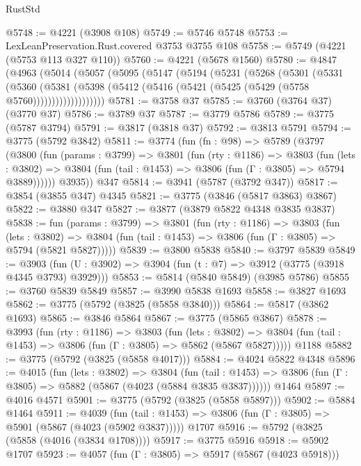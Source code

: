 \begin{lexlean}{RustStd}
\begin{coremodule}
{\begin{coremodule}
{{{{{{{{{{{{{{{{{{{{{{{{{{{{{{{@5748 := @4221 (@3908 @108)
@5749 := @5746 @5748
@5753 := LexLeanPreservation.Rust.covered @3753 @3755 @108
@5758 := @5749 (@4221 (@5753 @113 @327 @110))
@5760 := @4221 (@5678 @1560)
@5780 := @4847
    (@4963
      (@5014
        (@5057
          (@5095
            (@5147
              (@5194
                (@5231
                  (@5268
                    (@5301
                      (@5331
                        (@5360
                          (@5381
                            (@5398
                              (@5412 (@5416 (@5421 (@5425 (@5429 (@5758 @5760)))))))))))))))))))
@5781 := @3758 @37
@5785 := @3760 (@3764 @37) (@3770 @37)
@5786 := @3789 @37
@5787 := @3779 @5786
@5789 := @3775 (@5787 @3794)
@5791 := @3817 (@3818 @37)
@5792 := @3813 @5791
@5794 := @3775 (@5792 @3842)
@5811 := @3774
    (fun (fn : @98) =>
    @5789
      (@3797
        (@3800
          (fun (params : @3799) =>
          @3801
            (fun (rty : @1186) =>
            @3803
              (fun (lets : @3802) =>
              @3804 (fun (tail : @1453) => @3806 (fun (Γ : @3805) => @5794 @3889))))))
        @3935))
    @347
@5814 := @3941 (@5787 (@3792 @347))
@5817 := @3854 (@3855 @347) @4345
@5821 := @3775 (@3846 (@5817 @3863) @3867)
@5822 := @3880 @347
@5827 := @3877 (@3879 @5822 @4348 @3835 @3837)
@5838 := fun (params : @3799) =>
  @3801
    (fun (rty : @1186) =>
    @3803
      (fun (lets : @3802) =>
      @3804 (fun (tail : @1453) => @3806 (fun (Γ : @3805) => @5794 (@5821 @5827)))))
@5839 := @3800 @5838
@5840 := @3797 @5839
@5849 := @3903 (fun (U : @3902) => @3904 (fun (t : @7) => @3912 (@3775 (@3918 @4345 @3793) @3929)))
@5853 := @5814 (@5840 @5849) (@3985 @5786)
@5855 := @3760 @5839 @5849
@5857 := @3990 @5838 @1693
@5858 := @3827 @1693
@5862 := @3775 (@5792 (@3825 (@5858 @3840)))
@5864 := @5817 (@3862 @1693)
@5865 := @3846 @5864
@5867 := @3775 (@5865 @3867)
@5878 := @3993
    (fun (rty : @1186) =>
    @3803
      (fun (lets : @3802) =>
      @3804 (fun (tail : @1453) => @3806 (fun (Γ : @3805) => @5862 (@5867 @5827)))))
    @1188
@5882 := @3775 (@5792 (@3825 (@5858 @4017)))
@5884 := @4024 @5822 @4348
@5896 := @4015
    (fun (lets : @3802) =>
    @3804
      (fun (tail : @1453) => @3806 (fun (Γ : @3805) => @5882 (@5867 (@4023 (@5884 @3835 @3837))))))
    @1464
@5897 := @4016 @4571
@5901 := @3775 (@5792 (@3825 (@5858 @5897)))
@5902 := @5884 @1464
@5911 := @4039
    (fun (tail : @1453) => @3806 (fun (Γ : @3805) => @5901 (@5867 (@4023 (@5902 @3837)))))
    @1707
@5916 := @5792 (@3825 (@5858 (@4016 (@3834 @1708))))
@5917 := @3775 @5916
@5918 := @5902 @1707
@5923 := @4057 (fun (Γ : @3805) => @5917 (@5867 (@4023 @5918)))
}}}}}}}}}}}}}}}}}}}}}}}}}}}}}}}
\end{coremodule}}
\end{coremodule}
\end{lexlean}
